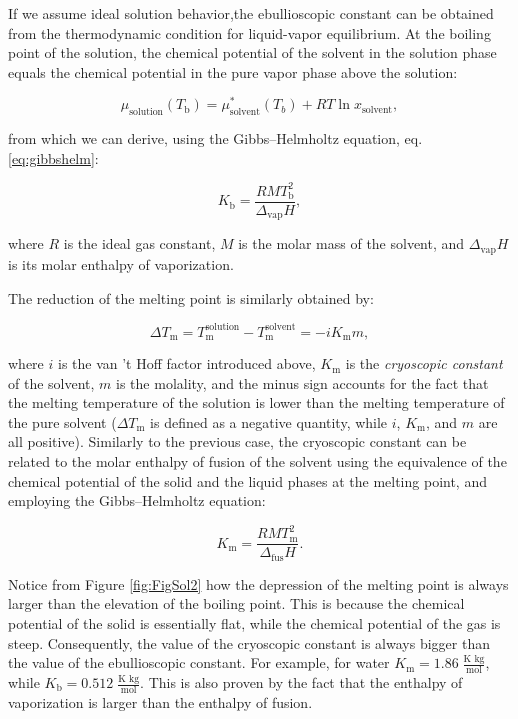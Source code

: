 \documentclass[
  9pt,
]{extbook}
\theoremstyle{definition}
\theoremstyle{definition}
\theoremstyle{definition}
\theoremstyle{remark}
\begin{document}
If we assume ideal solution behavior,the ebullioscopic constant can be obtained from the thermodynamic condition for liquid-vapor equilibrium. At the boiling point of the solution, the chemical potential of the solvent in the solution phase equals the chemical potential in the pure vapor phase above the solution:

\begin{equation}
\mu_{\text{solution}} (T_{\text{b}})  = \mu_{\text{solvent}}^*(T_b)  + RT\ln x_{\text{solvent}},
\label{eq:coll4}
\end{equation}

from which we can derive, using the Gibbs--Helmholtz equation, eq. \eqref{eq:gibbshelm}:

\begin{equation}
K_{\text{b}}=\frac{RMT_{\text{b}}^{2}}{\Delta_{\mathrm{vap}} H},
\label{eq:coll5}
\end{equation}

where \(R\) is the ideal gas constant, \(M\) is the molar mass of the solvent, and \(\Delta_{\mathrm{vap}} H\) is its molar enthalpy of vaporization.

The reduction of the melting point is similarly obtained by:

\begin{equation}
\Delta T_{\text{m}}=T_{\text{m}}^{\text{solution}}-T_{\text{m}}^{\text{solvent}}=-iK_{\text{m}}m,
\label{eq:coll6}
\end{equation}

where \(i\) is the van 't Hoff factor introduced above, \(K_{\text{m}}\) is the \emph{cryoscopic constant} of the solvent, \(m\) is the molality, and the minus sign accounts for the fact that the melting temperature of the solution is lower than the melting temperature of the pure solvent (\(\Delta T_{\text{m}}\) is defined as a negative quantity, while \(i\), \(K_{\text{m}}\), and \(m\) are all positive). Similarly to the previous case, the cryoscopic constant can be related to the molar enthalpy of fusion of the solvent using the equivalence of the chemical potential of the solid and the liquid phases at the melting point, and employing the Gibbs--Helmholtz equation:

\begin{equation}
K_{\text{m}}=\frac{RMT_{\text{m}}^{2}}{\Delta_{\mathrm{fus}}H}.
\label{eq:coll7}
\end{equation}

Notice from Figure \ref{fig:FigSol2} how the depression of the melting point is always larger than the elevation of the boiling point. This is because the chemical potential of the solid is essentially flat, while the chemical potential of the gas is steep. Consequently, the value of the cryoscopic constant is always bigger than the value of the ebullioscopic constant. For example, for water \(K_{\text{m}} = 1.86\; \frac{\text{K kg}}{\text{mol}}\), while \(K_{\text{b}} = 0.512\; \frac{\text{K kg}}{\text{mol}}\). This is also proven by the fact that the enthalpy of vaporization is larger than the enthalpy of fusion.
\end{document}
